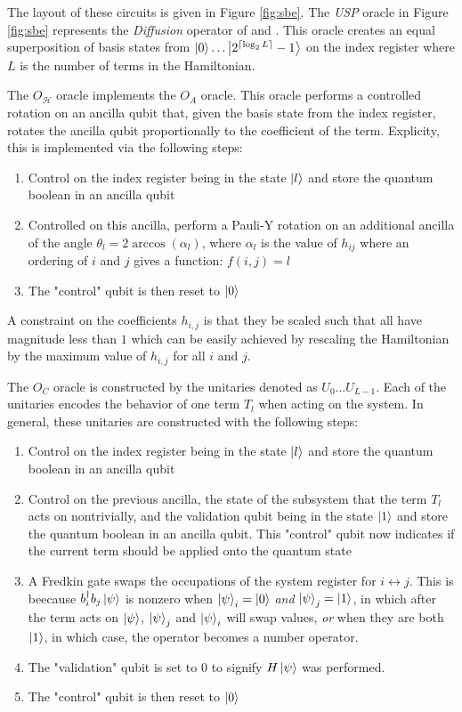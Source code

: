 The layout of these circuits is given in Figure \ref{fig:sbe}.
The \textit{USP} oracle in Figure \ref{fig:sbe} represents the \textit{Diffusion} operator of \cite{camps2024explicit} and \cite{liu2024efficient}.
This oracle creates an equal superposition of basis states from $\ket{0}\dots \ket{2^{\lceil \log_2{L} \rceil} - 1}$ on the index register where $L$ is the number of terms in the Hamiltonian.

The $O_\mathcal{H}$ oracle implements the $O_A$ oracle.
This oracle performs a controlled rotation on an ancilla qubit that, given the basis state from the index register, rotates the ancilla qubit proportionally to the coefficient of the term.
Explicity, this is implemented via the following steps:
\begin{enumerate}
    \item Control on the index register being in the state $\ket{l}$ and store the quantum boolean in an ancilla qubit
    \item Controlled on this ancilla, perform a Pauli-Y rotation on an additional ancilla of the angle $\theta_l = 2\arccos(\alpha_l)$, where $\alpha_l$ is the value of $h_{ij}$ where an ordering of $i$ and $j$ gives a function: $f(i, j) = l$
    \item The "control" qubit is then reset to $\ket{0}$
\end{enumerate}
A constraint on the coefficients $h_{i, j}$ is that they be scaled such that all have magnitude less than $1$ which can be easily achieved by rescaling the Hamiltonian by the maximum value of $h_{i, j}$ for all $i$ and $j$.

The $O_C$ oracle is constructed by the unitaries denoted as $U_0 \dots U_{L - 1}$. 
Each of the unitaries encodes the behavior of one term $T_l$ when acting on the system. 
In general, these unitaries are constructed with the following steps:
\begin{enumerate}
    \item Control on the index register being in the state $\ket{l}$ and store the quantum boolean in an ancilla qubit
    \item Control on the previous ancilla, the state of the subsystem that the term $T_l$ acts on nontrivially, and the validation qubit being in the state $\ket{1}$ and store the quantum boolean in an ancilla qubit. This "control" qubit now indicates if the current term should be applied onto the quantum state
    \item A Fredkin gate swaps the occupations of the system register for $i \leftrightarrow j$. This is beecause $b^\dagger_i b_j \ket{\psi}$ is nonzero when $\ket{\psi}_i = \ket{0}$ \textit{and} $\ket{\psi}_j = \ket{1}$, in which after the term acts on $\ket{\psi}$, $\ket{\psi}_j$ and $\ket{\psi}_i$ will swap values,  \textit{or} when they are both $\ket{1}$, in which case, the operator becomes a number operator.
    \item The "validation" qubit is set to $0$ to signify $H\ket{\psi}$ was performed.
    \item The "control" qubit is then reset to $\ket{0}$
\end{enumerate}

